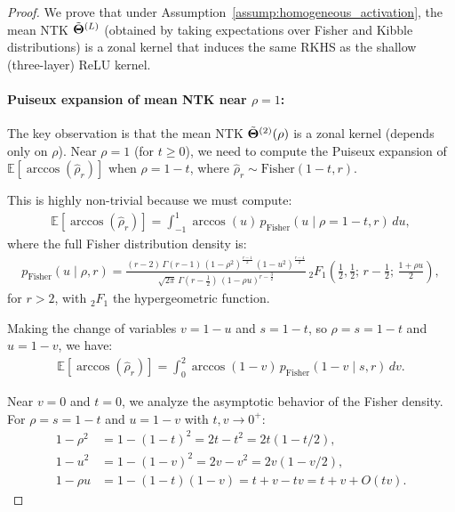 \begin{proof}
We prove that under Assumption~\ref{assump:homogeneous_activation}, the mean NTK \( \tilde{\boldsymbol{\Theta}}^{(L)} \) (obtained by taking expectations over Fisher and Kibble distributions) is a zonal kernel that induces the same RKHS as the shallow (three-layer) ReLU kernel.

\paragraph{Puiseux expansion of mean NTK near \( \rho = 1 \):}
The key observation is that the mean NTK \( \tilde{\boldsymbol{\Theta}}^{(2)}(\rho) \) is a zonal kernel (depends only on \( \rho \)). Near \( \rho = 1 \) (for \( t \ge 0 \)), we need to compute the Puiseux expansion of \( \mathbb{E}[\arccos(\hat{\rho}_r)] \) when \( \rho = 1-t \), where \( \hat{\rho}_r \sim \text{Fisher}(1-t, r) \).

This is highly non-trivial because we must compute:
\begin{align}
\mathbb{E}[\arccos(\hat{\rho}_r)] = \int_{-1}^{1} \arccos(u) \, p_{\text{Fisher}}(u \mid \rho=1-t, r) \, du,
\end{align}
where the full Fisher distribution density is:
\begin{align}
p_{\text{Fisher}}(u \mid \rho, r) = \frac{(r-2)\,\Gamma(r-1)\,(1-\rho^2)^{\frac{r-1}{2}}\,(1-u^2)^{\frac{r-4}{2}}}{\sqrt{2\pi}\,\Gamma(r-\tfrac{1}{2})\,(1-\rho u)^{r-\frac{3}{2}}}\,{}_2F_1\!\left(\tfrac{1}{2},\tfrac{1}{2};\, r-\tfrac{1}{2};\, \tfrac{1+\rho u}{2}\right),
\end{align}
for \( r > 2 \), with \( {}_2F_1 \) the hypergeometric function.

Making the change of variables \( v = 1-u \) and \( s = 1-t \), so \( \rho = s = 1-t \) and \( u = 1-v \), we have:
\begin{align}
\mathbb{E}[\arccos(\hat{\rho}_r)] = \int_{0}^{2} \arccos(1-v) \, p_{\text{Fisher}}(1-v \mid s, r) \, dv.
\end{align}

Near \( v=0 \) and \( t=0 \), we analyze the asymptotic behavior of the Fisher density. For \( \rho = s = 1-t \) and \( u = 1-v \) with \( t, v \to 0^+ \):
\begin{align}
1-\rho^2 &= 1 - (1-t)^2 = 2t - t^2 = 2t(1 - t/2), \\
1-u^2 &= 1 - (1-v)^2 = 2v - v^2 = 2v(1 - v/2), \\
1-\rho u &= 1 - (1-t)(1-v) = t + v - tv = t + v + O(tv).
\end{align}


\end{proof}
